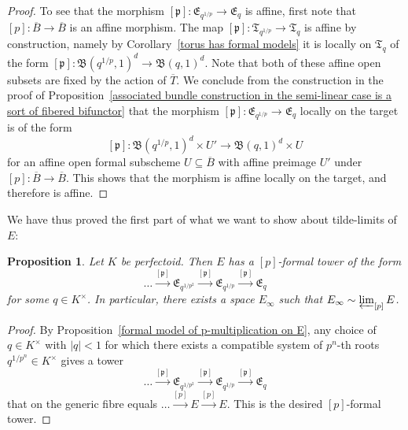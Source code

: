 \documentclass[10pt,oneside]{amsart}
\newtheorem{proposition}[theorem]{Proposition}
\theoremstyle{definition}
\begin{document}
\begin{proof}
		To see that the morphism $[\mathfrak p]:\mathfrak E_{q^{1/p}} \rightarrow  \mathfrak E_{q}$ is affine, first note that $[p]:\overline{B}\rightarrow \overline{B}$ is an affine morphism. The map $[\mathfrak p]:\mathfrak T_{q^{1/p}}\rightarrow \mathfrak T_{q}$ is affine by construction, namely by Corollary~\ref{torus has formal models} it is locally on $\mathfrak T_{q}$ of the form $[\mathfrak p]:\mathfrak B(q^{1/p},1)^d\rightarrow \mathfrak B(q,1)^d$. Note that both of these affine open subsets are fixed by the action of $\overline{T}$.
		We conclude from the construction in the proof of Proposition~\ref{associated bundle construction in the semi-linear case is a sort of fibered bifunctor} that the morphism  $[\mathfrak p]:\mathfrak E_{q^{1/p}} \rightarrow  \mathfrak E_{q}$ locally on the target is of the form
		\[[\mathfrak p]:\mathfrak B(q^{1/p},1)^d \times U' \rightarrow \mathfrak B(q,1)^d \times U\]
		for an affine open formal subscheme $U\subseteq \overline{B}$ with affine preimage $U'$ under $[p]:\overline{B}\rightarrow \overline{B}$. This shows that the morphism is affine locally on the target, and therefore is affine.
	\end{proof}
	
	We have thus proved the first part of what we want to show about tilde-limits of $E$:
	\begin{proposition}\label{p-formal tower exists for E}
		Let $K$ be perfectoid. Then $E$ has a $[p]$-formal tower of the form
		\[\dots \xrightarrow{[\mathfrak p]} \mathfrak E_{q^{1/p^2}}\xrightarrow{[\mathfrak p]} \mathfrak E_{q^{1/p}}\xrightarrow{[\mathfrak p]} \mathfrak E_q\]
		for some $q\in K^\times$. In particular, there exists a space $E_\infty$ such that $E_\infty\sim \varprojlim_{[p]}E$.
	\end{proposition}
	\begin{proof}
		By Proposition~\ref{formal model of p-multiplication on E}, any choice of $q\in K^\times$ with $|q|<1$ for which there exists a compatible system of $p^n$-th roots $q^{1/p^n}\in K^\times$ gives a tower
		\[\dots \xrightarrow{[\mathfrak p]} \mathfrak E_{q^{1/p^2}}\xrightarrow{[\mathfrak p]} \mathfrak E_{q^{1/p}}\xrightarrow{[\mathfrak p]} \mathfrak E_q\]
		that on the generic fibre equals $\dots\xrightarrow{[p]} E\xrightarrow{[p]} E$. This is the desired $[p]$-formal tower.
	\end{proof}
	
\end{document}
